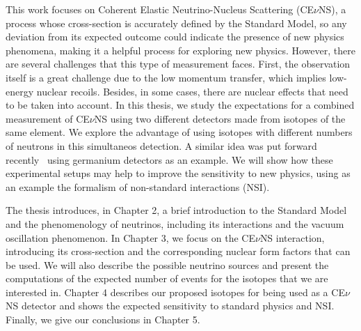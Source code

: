 This work focuses on Coherent Elastic Neutrino-Nucleus Scattering
(CE$\nu$NS), a process whose cross-section is accurately defined by
the Standard Model, so any deviation from its expected outcome could
indicate the presence of new physics phenomena, making it a helpful
process for exploring new physics. However, there are several
challenges that this type of measurement faces. First, the observation
itself is a great challenge due to the low momentum transfer, which
implies low-energy nuclear recoils. Besides, in some cases, there are
nuclear effects that need to be taken into account. In this thesis, we
study the expectations for a combined measurement of CE$\nu$NS using
two different detectors made from isotopes of the same element. 
We explore the advantage of using isotopes
with different numbers of neutrons in this simultaneos detection.
A
similar idea was put forward recently~\cite{Galindo} using germanium
detectors as an example.
We
will show how these experimental setups may help to improve the
sensitivity to new physics, using as an example the formalism of
non-standard interactions (NSI).


The thesis introduces, in Chapter 2, a brief introduction to the
Standard Model and the phenomenology of neutrinos, including its
interactions and the vacuum oscillation phenomenon. In Chapter 3, we
focus on the CE$\nu$NS interaction, introducing its cross-section and
the corresponding nuclear form factors that can be used. We will also
describe the possible neutrino sources and present the computations of
the expected number of events for the isotopes that we are interested
in. Chapter 4 describes our proposed isotopes for being used as
a CE$\nu$NS detector and shows the expected sensitivity to standard physics and  NSI. Finally, we give our conclusions in Chapter 5. 





